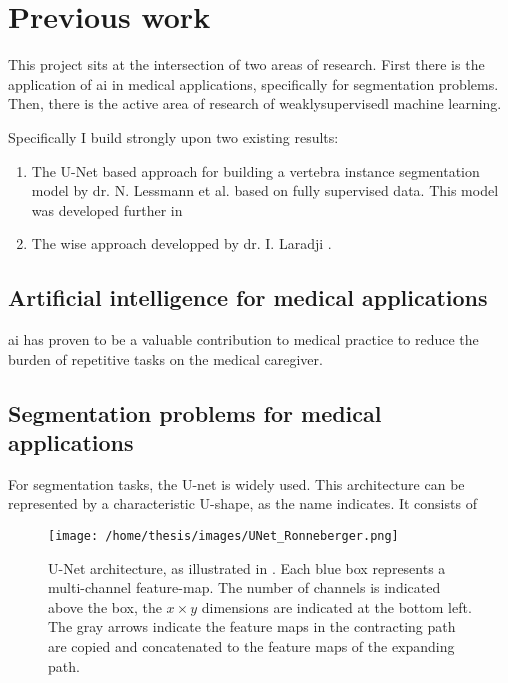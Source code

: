 \chapter{Previous work}

This project sits at the intersection of two areas of research. 
First there is the application of \Gls{ai} in medical applications, specifically for segmentation problems.
Then, there is the active area of research of \Gls{weaklysupervisedl} machine learning.


Specifically I build strongly upon two existing results:

\begin{enumerate}
    \item The U-Net based approach for building a vertebra instance segmentation model by dr. N. Lessmann et al. \cite{Lessmann2018} based on fully supervised data. This model was developed further in \cite{Chuang2019}
    \item The \acrfull{wise} approach developped by dr. I. Laradji \cite{Laradji2020,Laradji2018}. 
\end{enumerate}

\section{Artificial intelligence for medical applications}


\Gls{ai} has proven to be a valuable contribution to medical practice to reduce the burden of repetitive tasks on the medical caregiver.


\section{Segmentation problems for medical applications}


For segmentation tasks, the U-net \cite{Ronneberger2015} is widely used. 
This architecture can be represented by a characteristic U-shape, as the name indicates.
It consists of 

\begin{SCfigure}[][htb]
    \texttt{[image: /home/thesis/images/UNet\_Ronneberger.png]}
    \caption{U-Net architecture, as illustrated in \cite{Ronneberger2015}. 
    Each blue box represents a multi-channel feature-map. 
    The number of channels is indicated above the box, the $x \times y$ dimensions are indicated at the bottom left.
    The gray arrows indicate the feature maps in the contracting path are copied and concatenated to the feature maps of the expanding path.}
    \label{fig:unet}
\end{SCfigure}

